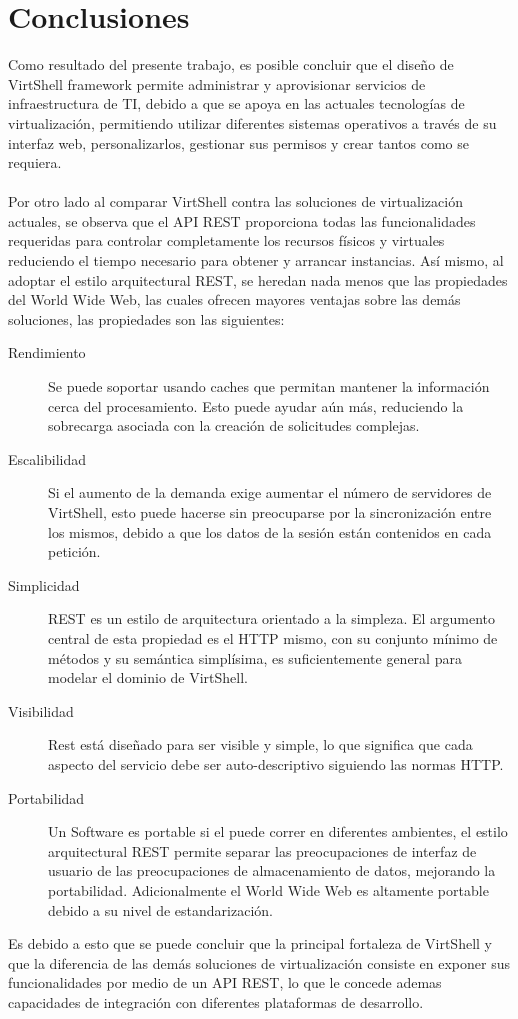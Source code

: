 \chapter{Conclusiones}
\label{capconslusiones}

Como resultado del presente trabajo, es posible concluir que el diseño de VirtShell framework permite administrar y aprovisionar servicios de infraestructura de TI, debido a que se apoya en las actuales tecnologías de virtualización, permitiendo utilizar diferentes sistemas operativos a través de su interfaz web, personalizarlos, gestionar sus permisos y crear tantos como se requiera.\\
\\
Por otro lado al comparar VirtShell contra las soluciones de virtualización actuales, se observa que el API REST proporciona todas las funcionalidades requeridas para controlar completamente los recursos físicos y virtuales reduciendo el tiempo necesario para obtener y arrancar instancias. Así mismo, al adoptar el estilo arquitectural REST, se heredan nada menos que las propiedades del World Wide Web, las cuales ofrecen mayores ventajas sobre las demás soluciones, las propiedades son las siguientes:

\begin{description}
\item [Rendimiento] Se puede soportar usando caches que permitan mantener la información cerca del procesamiento. Esto puede ayudar aún más, reduciendo la sobrecarga asociada con la creación de solicitudes complejas.
\item [Escalibilidad] Si el aumento de la demanda exige aumentar el número de servidores de VirtShell, esto puede hacerse sin preocuparse por la sincronización entre los mismos, debido a que los datos de la sesión están contenidos en cada petición.
\item [Simplicidad] REST es un estilo de arquitectura orientado a la simpleza. El argumento  central de esta propiedad es el HTTP mismo, con su conjunto mínimo de métodos y su semántica simplísima, es suficientemente general para modelar el dominio de VirtShell.
\item [Visibilidad] Rest está diseñado para ser visible y simple, lo que significa que cada aspecto del servicio debe ser auto-descriptivo siguiendo las normas HTTP.
\item [Portabilidad] Un Software es portable si el puede correr en diferentes ambientes, el estilo arquitectural REST permite separar las preocupaciones de interfaz de usuario de las preocupaciones de almacenamiento de datos, mejorando la portabilidad. Adicionalmente el World Wide Web es altamente portable debido a su nivel de estandarización.
\end{description}

Es debido a esto que se puede concluir que la principal fortaleza de VirtShell y que la diferencia de las demás soluciones de virtualización consiste en exponer sus funcionalidades por medio de un API REST, lo que le concede ademas capacidades de integración con diferentes plataformas de desarrollo.